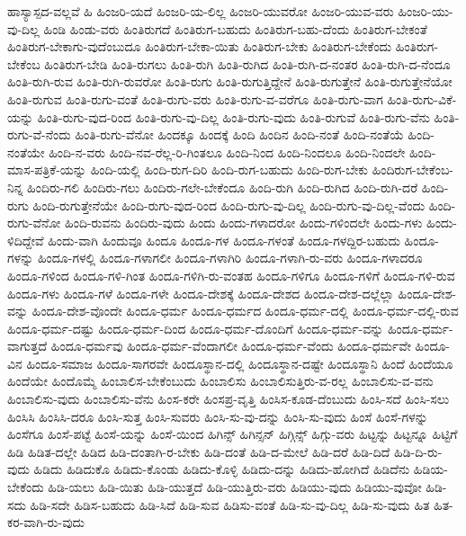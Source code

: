 {ಹಾಸ್ಯಾಸ್ಪದ-ವಲ್ಲವೆ
ಹಿ
ಹಿಂಜರಿ-ಯದೆ
ಹಿಂಜರಿ-ಯ-ಲಿಲ್ಲ
ಹಿಂಜರಿ-ಯುವರೋ
ಹಿಂಜರಿ-ಯುವ-ವರು
ಹಿಂಜರಿ-ಯು-ವು-ದಿಲ್ಲ
ಹಿಂಡಿ
ಹಿಂಡು-ವರು
ಹಿಂತಿರುಗದೆ
ಹಿಂತಿರುಗ-ಬಹುದು
ಹಿಂತಿರುಗ-ಬಹು-ದೆಂದು
ಹಿಂತಿರುಗ-ಬೇಕಂತೆ
ಹಿಂತಿರುಗ-ಬೇಕಾಗು-ವುದೆಂಬುದೂ
ಹಿಂತಿರುಗ-ಬೇಕಾ-ಯಿತು
ಹಿಂತಿರುಗ-ಬೇಕು
ಹಿಂತಿರುಗ-ಬೇಕೆಂದು
ಹಿಂತಿರುಗ-ಬೇಕೆಂಬ
ಹಿಂತಿರುಗ-ಬೇಡಿ
ಹಿಂತಿ-ರುಗಲು
ಹಿಂತಿ-ರುಗಿ
ಹಿಂತಿ-ರುಗಿದ
ಹಿಂತಿ-ರುಗಿ-ದ-ನಂತರ
ಹಿಂತಿ-ರುಗಿ-ದ-ನೆಂದೂ
ಹಿಂತಿ-ರುಗಿ-ರುವ
ಹಿಂತಿ-ರುಗಿ-ರುವರೋ
ಹಿಂತಿ-ರುಗು
ಹಿಂತಿ-ರುಗುತ್ತಿದ್ದೇನೆ
ಹಿಂತಿ-ರುಗುತ್ತೇನೆ
ಹಿಂತಿ-ರುಗುತ್ತೇನೆಯೋ
ಹಿಂತಿ-ರುಗುವ
ಹಿಂತಿ-ರುಗು-ವಂತೆ
ಹಿಂತಿ-ರುಗು-ವರು
ಹಿಂತಿ-ರುಗು-ವ-ವರೆಗೂ
ಹಿಂತಿ-ರುಗು-ವಾಗ
ಹಿಂತಿ-ರುಗು-ವಿಕೆ-ಯನ್ನು
ಹಿಂತಿ-ರುಗು-ವುದ-ರಿಂದ
ಹಿಂತಿ-ರುಗು-ವು-ದಿಲ್ಲ
ಹಿಂತಿ-ರುಗು-ವುದು
ಹಿಂತಿ-ರುಗುವೆ
ಹಿಂತಿ-ರುಗು-ವೆನು
ಹಿಂತಿ-ರುಗು-ವೆ-ನೆಂದು
ಹಿಂತಿ-ರುಗು-ವೆನೋ
ಹಿಂದಕ್ಕೂ
ಹಿಂದಕ್ಕೆ
ಹಿಂದಿ
ಹಿಂದಿನ
ಹಿಂದಿ-ನಂತೆ
ಹಿಂದಿ-ನಂತೆಯೆ
ಹಿಂದಿ-ನಂತೆಯೇ
ಹಿಂದಿ-ನ-ವರು
ಹಿಂದಿ-ನವ-ರೆಲ್ಲ-ರಿ-ಗಿಂತಲೂ
ಹಿಂದಿ-ನಿಂದ
ಹಿಂದಿ-ನಿಂದಲೂ
ಹಿಂದಿ-ನಿಂದಲೇ
ಹಿಂದಿ-ಮಾಸ-ಪತ್ರಿಕೆ-ಯನ್ನು
ಹಿಂದಿ-ಯಲ್ಲಿ
ಹಿಂದಿ-ರುಗ-ದಿರಿ
ಹಿಂದಿ-ರುಗ-ಬಹುದು
ಹಿಂದಿ-ರುಗ-ಬೇಕು
ಹಿಂದಿರುಗ-ಬೇಕೆಂಬ-ನಿನ್ನ
ಹಿಂದಿರು-ಗಲಿ
ಹಿಂದಿರು-ಗಲು
ಹಿಂದಿರು-ಗಲೇ-ಬೇಕೆಂದೂ
ಹಿಂದಿ-ರುಗಿ
ಹಿಂದಿ-ರುಗಿದ
ಹಿಂದಿ-ರುಗಿ-ದರೆ
ಹಿಂದಿ-ರುಗು
ಹಿಂದಿ-ರುಗುತ್ತೇನೆಯೇ
ಹಿಂದಿ-ರುಗು-ವುದ-ರಿಂದ
ಹಿಂದಿ-ರುಗು-ವು-ದಿಲ್ಲ
ಹಿಂದಿ-ರುಗು-ವು-ದಿಲ್ಲ-ವೆಂದು
ಹಿಂದಿ-ರುಗು-ವೆನೋ
ಹಿಂದಿ-ರುವನು
ಹಿಂದಿರು-ವುದು
ಹಿಂದು
ಹಿಂದು-ಗಳಾದರೋ
ಹಿಂದು-ಗಳಿಂದಲೇ
ಹಿಂದು-ಗಳು
ಹಿಂದು-ಳಿದಿದ್ದೇವೆ
ಹಿಂದು-ವಾಗಿ
ಹಿಂದುವೂ
ಹಿಂದೂ
ಹಿಂದೂ-ಗಳ
ಹಿಂದೂ-ಗಳಂತೆ
ಹಿಂದೂ-ಗಳದ್ದಿರ-ಬಹುದು
ಹಿಂದೂ-ಗಳನ್ನು
ಹಿಂದೂ-ಗಳಲ್ಲಿ
ಹಿಂದೂ-ಗಳಾಗಲೀ
ಹಿಂದೂ-ಗಳಾಗಿರಿ
ಹಿಂದೂ-ಗಳಾಗಿ-ರು-ವರು
ಹಿಂದೂ-ಗಳಾದರೂ
ಹಿಂದೂ-ಗಳಿಂದ
ಹಿಂದೂ-ಗಳಿ-ಗಿಂತ
ಹಿಂದೂ-ಗಳಿಗಿ-ರು-ವಂತಹ
ಹಿಂದೂ-ಗಳಿಗೂ
ಹಿಂದೂ-ಗಳಿಗೆ
ಹಿಂದೂ-ಗಳಿ-ರುವ
ಹಿಂದೂ-ಗಳು
ಹಿಂದೂ-ಗಳೆ
ಹಿಂದೂ-ಗಳೇ
ಹಿಂದೂ-ದೇಶಕ್ಕೆ
ಹಿಂದೂ-ದೇಶದ
ಹಿಂದೂ-ದೇಶ-ದಲ್ಲೆಲ್ಲಾ
ಹಿಂದೂ-ದೇಶ-ವನ್ನು
ಹಿಂದೂ-ದೇಶ-ವೊಂದೇ
ಹಿಂದೂ-ಧರ್ಮ
ಹಿಂದೂ-ಧರ್ಮದ
ಹಿಂದೂ-ಧರ್ಮ-ದಲ್ಲಿ
ಹಿಂದೂ-ಧರ್ಮ-ದಲ್ಲಿ-ರುವ
ಹಿಂದೂ-ಧರ್ಮ-ದಷ್ಟು
ಹಿಂದೂ-ಧರ್ಮ-ದಿಂದ
ಹಿಂದೂ-ಧರ್ಮ-ದೊಂದಿಗೆ
ಹಿಂದೂ-ಧರ್ಮ-ವನ್ನು
ಹಿಂದೂ-ಧರ್ಮ-ವಾಗುತ್ತದೆ
ಹಿಂದೂ-ಧರ್ಮವು
ಹಿಂದೂ-ಧರ್ಮ-ವೆಂದಾಗಲೀ
ಹಿಂದೂ-ಧರ್ಮ-ವೆಂದು
ಹಿಂದೂ-ಧರ್ಮವೇ
ಹಿಂದೂ-ವಿನ
ಹಿಂದೂ-ಸಮಾಜ
ಹಿಂದೂ-ಸಾಗರವೇ
ಹಿಂದೂಸ್ಥಾನ-ದಲ್ಲಿ
ಹಿಂದೂಸ್ಥಾನ-ದಷ್ಟೇ
ಹಿಂದೂಸ್ಥಾನಿ
ಹಿಂದೆ
ಹಿಂದೆಯೂ
ಹಿಂದೆಯೇ
ಹಿಂದೊಮ್ಮೆ
ಹಿಂಬಾಲಿಸ-ಬೇಕೆಂಬುದು
ಹಿಂಬಾಲಿಸು
ಹಿಂಬಾಲಿಸುತ್ತಿರು-ವ-ರಲ್ಲ
ಹಿಂಬಾಲಿಸು-ವ-ವನು
ಹಿಂಬಾಲಿಸು-ವುದು
ಹಿಂಬಾಲಿಸು-ವೆನು
ಹಿಂಸ-ಕರೇ
ಹಿಂಸಪ್ರ-ವೃತ್ತಿ
ಹಿಂಸಿಸ-ಕೂಡ-ದೆಂಬುದು
ಹಿಂಸಿ-ಸದೆ
ಹಿಂಸಿ-ಸಲು
ಹಿಂಸಿಸಿ
ಹಿಂಸಿಸಿ-ದರೂ
ಹಿಂಸಿ-ಸುತ್ತ
ಹಿಂಸಿ-ಸುವರು
ಹಿಂಸಿ-ಸು-ವು-ದನ್ನು
ಹಿಂಸಿ-ಸು-ವುದು
ಹಿಂಸೆ
ಹಿಂಸೆ-ಗಳನ್ನು
ಹಿಂಸೆಗೂ
ಹಿಂಸೆ-ಪಟ್ಟೆ
ಹಿಂಸೆ-ಯನ್ನು
ಹಿಂಸೆ-ಯಿಂದ
ಹಿಗಿನ್ಸ್
ಹಿಗಿನ್ಸನ್
ಹಿಗ್ಗಿನ್ಸ್
ಹಿಗ್ಗು-ವರು
ಹಿಟ್ಟನ್ನು
ಹಿಟ್ಟನ್ನೂ
ಹಿಟ್ಟಿಗೆ
ಹಿಡಿ
ಹಿಡಿತ-ದಲ್ಲೇ
ಹಿಡಿದ
ಹಿಡಿ-ದಂತಾಗಿ-ರ-ಬೇಕು
ಹಿಡಿ-ದಂತೆ
ಹಿಡಿ-ದ-ಮೇಲೆ
ಹಿಡಿ-ದರೆ
ಹಿಡಿ-ದಿದೆ
ಹಿಡಿ-ದಿ-ರು-ವುದು
ಹಿಡಿದು
ಹಿಡಿದುಕೊ
ಹಿಡಿದು-ಕೊಂಡು
ಹಿಡಿದು-ಕೊಳ್ಳಿ
ಹಿಡಿದು-ದನ್ನು
ಹಿಡಿದು-ಹೋಗಿದೆ
ಹಿಡಿದೆನು
ಹಿಡಿಯ-ಬೇಕೆಂದು
ಹಿಡಿ-ಯಲು
ಹಿಡಿ-ಯಿತು
ಹಿಡಿ-ಯುತ್ತದೆ
ಹಿಡಿ-ಯುತ್ತಿರು-ವರು
ಹಿಡಿಯು-ವುದು
ಹಿಡಿಯು-ವುವೋ
ಹಿಡಿ-ಸದು
ಹಿಡಿ-ಸದೇ
ಹಿಡಿಸ-ಬಹುದು
ಹಿಡಿ-ಸಿದೆ
ಹಿಡಿ-ಸುವ
ಹಿಡಿಸು-ವಂತೆ
ಹಿಡಿ-ಸು-ವು-ದಿಲ್ಲ
ಹಿಡಿ-ಸು-ವುದು
ಹಿತ
ಹಿತ-ಕರ-ವಾಗಿ-ರು-ವುದು
}
